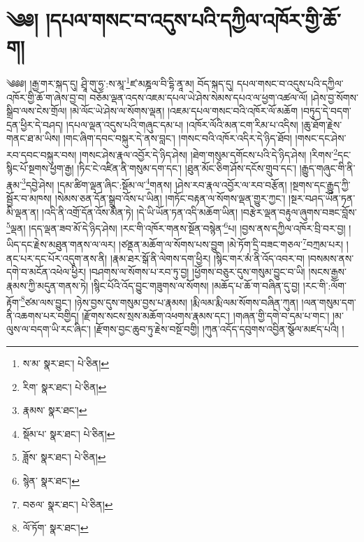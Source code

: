 \setcounter{footnote}{0} 
\chapter{༄༅། །དཔལ་གསང་བ་འདུས་པའི་དཀྱིལ་འཁོར་གྱི་ཆོ་ག།}༄༅༅། །རྒྱ་གར་སྐད་དུ། ཤྲཱི་གུ་ཧྱ་:ས་མཱ་\footnote{ས་མ་  སྣར་ཐང་།  པེ་ཅིན། }ཛ་མཎྜལ་བི་དྷི་ནཱ་མ། བོད་སྐད་དུ། དཔལ་གསང་བ་འདུས་པའི་དཀྱིལ་འཁོར་གྱི་ཆོ་ག་ཞེས་བྱ་བ། བཅོམ་ལྡན་འདས་འཇམ་དཔལ་ཡེ་ཤེས་སེམས་དཔའ་ལ་ཕྱག་འཚལ་ལོ། །ཤེས་བྱ་སོགས་སྒྲིབ་ལས་ངེས་གྲོལ། །མེ་ལོང་ཡེ་ཤེས་ལ་སོགས་ལྡན། །འཇམ་དཔལ་གསང་བའི་འཁོར་ལོ་མཆོག །བཏུད་དེ་བདག་དྲན་ཕྱིར་དེ་བཤད། །དཔལ་ལྡན་འདུས་པའི་གཞུང་དམ་པ། །འཁོར་ལོའི་མན་ངག་རིམ་པ་འདིས། །ཆུ་ཐོག་རྗེས་གནང་ཐ་མ་ཡིས། །གང་ཞིག་དབང་བསྐུར་དེ་ནས་བླང་། །གསང་བའི་འཁོར་འདིར་དེ་ཉིད་ཐོབ། །གསང་དང་ཤེས་རབ་དབང་བསྐུར་བས། །གསང་ཤེས་རྣལ་འབྱོར་དེ་ཉིད་ཤེས། །ཐེག་གསུམ་དགོངས་པའི་དེ་ཉིད་ཤེས། །རིགས་\footnote{རིག་  སྣར་ཐང་།  པེ་ཅིན། }དང་སྙིང་པོ་སྔགས་ཕྱག་རྒྱ། །ཏིང་ངེ་འཛིན་ནི་གསུམ་དག་དང་། །ཐུན་མོང་ཅིག་ཤོས་དངོས་གྲུབ་དང་། །རྒྱུད་གཞུང་གི་ནི་རྣམ་\footnote{རྣམས་  སྣར་ཐང་། }དབྱེ་ཤེས། །དམ་ཚིག་ལྡན་ཞིང་:སྡོམ་ལ་\footnote{སྡོམ་པ་  སྣར་ཐང་།  པེ་ཅིན། }གནས། །ཤེས་རབ་རྣལ་འབྱོར་ལ་རབ་བརྩོན། །སྔགས་དང་རྒྱུད་ཀྱི་སྦྱོར་བ་མཁས། །སེམས་ཅན་དོན་སྒྲུབ་འོས་པ་ཡིན། །གཏོང་བརྟན་ལ་སོགས་ལྡན་གྱུར་ཀྱང་། །སྔར་བཤད་ཡོན་ཏན་མི་ལྡན་ན། །འདི་ནི་འགྲོ་དོན་འོས་མིན་ཏེ། །དེ་ཡི་ཡོན་ཏན་འདི་མཆོག་ཡིན། །བརྩེར་ལྡན་བརྟུལ་ཞུགས་བཟང་བློས་\footnote{ཟློས་  སྣར་ཐང་།  པེ་ཅིན། }ལྡན། །དད་ལྡན་ཟབ་མོ་དེ་ཉིད་ཤེས། །རང་གི་འཁོར་གནས་སྔོན་བསྙེན་\footnote{སྙེན་  སྣར་ཐང་། }པ། །བྱས་ནས་དཀྱིལ་འཁོར་བྲི་བར་བྱ། །ཡིད་དང་རྗེས་མཐུན་གནས་ལ་ལར། །ཙནྡན་མཆོག་ལ་སོགས་པས་བྱུག །མེ་ཏོག་དྲི་བཟང་གཅལ་\footnote{བཅལ་  སྣར་ཐང་།  པེ་ཅིན། }བཀྲམ་པར། །ནང་པར་དང་པོར་འདུག་ནས་ནི། །རྣམ་ཐར་སྒོ་ནི་ལེགས་དག་ཕྱིར། །སྙིང་གར་མཾ་ནི་འོད་འབར་བ། །བསམས་ནས་དགེ་བ་མངོན་འཕེལ་ཕྱིར། །བཤགས་ལ་སོགས་པ་རབ་ཏུ་བྱ། །ཕྱོགས་བཅུར་དུས་གསུམ་བྱུང་བ་ཡི། །སངས་རྒྱས་རྣམས་ཀྱི་མདུན་གནས་ཏེ། །སྙིང་པོའི་འོད་བྱུང་གཟུགས་ལ་སོགས། །མཆོད་པ་ཆོ་ག་བཞིན་དུ་བྱ། །རང་གི་:ལོག་རྟོག་\footnote{ལོ་ཏོག་  སྣར་ཐང་། }ཙམ་ལས་བྱུང་། །ཉེས་བྱས་དུས་གསུམ་བྱས་པ་རྣམས། །རྨི་ལམ་རྨི་ལམ་སོགས་བཞིན་ཀུན། །ལན་གསུམ་དག་ནི་འཆགས་པར་བགྱིད། །རྫོགས་སངས་སྲས་མཆོག་འཕགས་རྣམས་དང་། །གཞན་གྱི་དགེ་བ་དམ་པ་གང་། །མ་ལུས་ལ་བདག་ཡི་རང་ཞིང་། །རྫོགས་བྱང་ཆུབ་ཏུ་རྗེས་བསྔོ་བགྱི། །ཀུན་འདོད་དབུགས་འབྱིན་སྩོལ་མཛད་པའི། །
